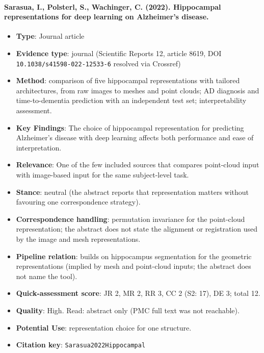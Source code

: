 \documentclass[journal,onecolumn]{IEEEtran}
\begin{document}
\paragraph{Sarasua, I., Polsterl, S., Wachinger, C. (2022). Hippocampal representations for deep learning on Alzheimer's disease.~\cite{Sarasua2022Hippocampal}}\mbox{}

\begin{itemize}

\item{} \textbf{Type}: Journal article

\item{} \textbf{Evidence type}: journal (Scientific Reports 12, article 8619, DOI \nolinkurl{10.1038/s41598-022-12533-6} resolved via Crossref)

\item{} \textbf{Method}: comparison of five hippocampal representations with tailored architectures, from raw images to meshes and point clouds; AD diagnosis and time-to-dementia prediction with an independent test set; interpretability assessment.

\item{} \textbf{Key Findings}: The choice of hippocampal representation for predicting Alzheimer's disease with deep learning affects both performance and ease of interpretation.

\item{} \textbf{Relevance}: One of the few included sources that compares point-cloud input with image-based input for the same subject-level task.

\item{} \textbf{Stance}: neutral (the abstract reports that representation matters without favouring one correspondence strategy).

\item{} \textbf{Correspondence handling}: permutation invariance for the point-cloud representation; the abstract does not state the alignment or registration used by the image and mesh representations.

\item{} \textbf{Pipeline relation}: builds on hippocampus segmentation for the geometric representations (implied by mesh and point-cloud inputs; the abstract does not name the tool).

\item{} \textbf{Quick-assessment score}: JR 2, MR 2, RR 3, CC 2 (S2: 17), DE 3; total 12.

\item{} \textbf{Quality}: High. Read: abstract only (PMC full text was not reachable).

\item{} \textbf{Potential Use}: representation choice for one structure.

\item{} \textbf{Citation key}: \texttt{Sarasua2022Hippocampal}

\end{itemize}
\end{document}
